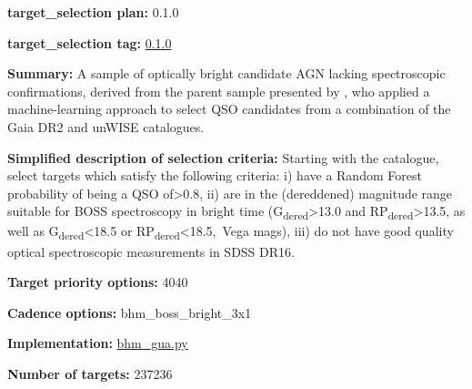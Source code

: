 \noindent\textbf{target\_selection plan:} 0.1.0

\noindent\textbf{target\_selection tag:}
\href{https://github.com/sdss/target_selection/tree/0.1.0/}{0.1.0}

\noindent\textbf{Summary:} A sample of optically bright candidate AGN lacking
spectroscopic confirmations, derived from the parent sample presented by
\citet{Shu2019}, who applied a machine-learning approach to select QSO
candidates from a combination of the Gaia DR2 and unWISE catalogues.

\noindent\textbf{Simplified description of selection criteria:} Starting with the
\citet{Shu2019} catalogue, select targets which satisfy the following
criteria: i) have a Random Forest probability of being a QSO
of\textgreater0.8, ii) are in the (dereddened) magnitude range suitable
for BOSS spectroscopy in bright time
(G\textsubscript{dered}\textgreater13.0 and
RP\textsubscript{dered}\textgreater13.5, as well as
G\textsubscript{dered}\textless18.5 or
RP\textsubscript{dered}\textless18.5,~Vega mags), iii) do not have good
quality optical spectroscopic measurements in SDSS DR16.


\noindent\textbf{Target priority options:} 4040

\noindent\textbf{Cadence options:} bhm\_boss\_bright\_3x1

\noindent\textbf{Implementation:}
\href{https://github.com/sdss/target_selection/blob/0.1.0/python/target_selection/cartons/bhm_gua.py}{bhm\_gua.py}

\noindent\textbf{Number of targets:} 237236

